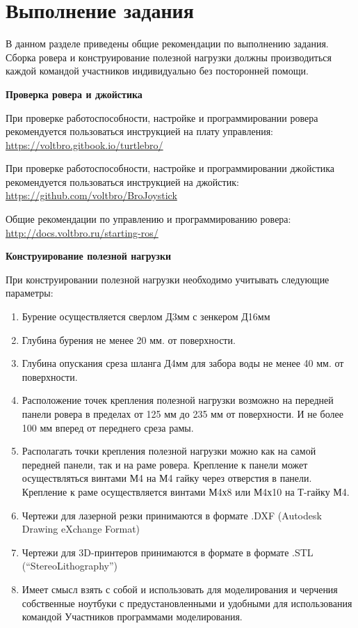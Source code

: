 \section{Выполнение задания}

В данном разделе приведены общие рекомендации по выполнению задания. Сборка ровера и конструирование полезной нагрузки должны производиться каждой командой участников индивидуально без посторонней помощи.

\textbf{Проверка ровера и джойстика}

При проверке работоспособности, настройке и программировании ровера рекомендуется пользоваться инструкцией на плату управления:
\url{https://voltbro.gitbook.io/turtlebro/}

При проверке работоспособности, настройке и программировании джойстика рекомендуется пользоваться инструкцией на джойстик:
\url{https://github.com/voltbro/BroJoystick}

Общие рекомендации по управлению и программированию ровера:
\url{http://docs.voltbro.ru/starting-ros/}


\textbf{Конструирование полезной нагрузки}

При конструировании полезной нагрузки необходимо учитывать следующие параметры:
\begin{enumerate}
    \item Бурение осуществляется сверлом Д3мм с зенкером Д16мм
    \item Глубина бурения не менее 20 мм. от поверхности.
    \item Глубина опускания среза шланга Д4мм для забора воды не менее 40 мм. от поверхности.
    \item Расположение точек крепления полезной нагрузки возможно на передней панели ровера в пределах от 125 мм до 235 мм от поверхности. И не более 100 мм вперед от переднего среза рамы.
    \item Располагать точки крепления полезной нагрузки можно как на самой передней панели, так и на раме ровера. Крепление к панели может осуществляться винтами М4 на М4 гайку через отверстия в панели. Крепление к раме осуществляется винтами М4х8 или М4х10 на Т-гайку М4.
    \item Чертежи для лазерной резки принимаются в формате .DXF (Autodesk Drawing eXchange Format)
    \item Чертежи для 3D-принтеров принимаются в формате в формате .STL \linebreak (“StereoLithography”)
    \item Имеет смысл взять с собой и использовать для моделирования и черчения собственные ноутбуки с предустановленными и удобными для использования командой Участников программами моделирования.
\end{enumerate}

